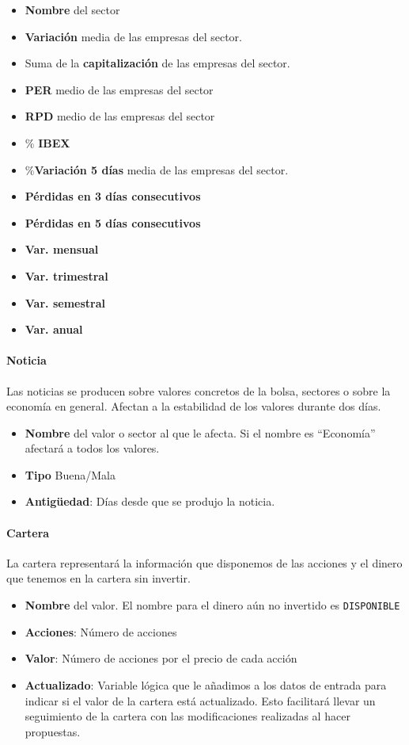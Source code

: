 \documentclass[11pt,leqno]{article}
\theoremstyle{definition_wo_parentheses}
\theoremstyle{plain}
\theoremstyle{remark}
\begin{document}
	\begin{itemize}
		\item \textbf{Nombre} del sector
		\item \textbf{Variación} media de las empresas del sector.
		\item Suma de la \textbf{capitalización} de las empresas del sector.
		\item \textbf{PER} medio de las empresas del sector
		\item \textbf{RPD} medio de las empresas del sector
		\item $\mathbf{\%}$ \textbf{IBEX}
		\item $\mathbf{\%}$\textbf{Variación 5 días} media de las empresas del sector.
		\item \textbf{Pérdidas en 3 días consecutivos}
		\item \textbf{Pérdidas en 5 días consecutivos}
		\item \textbf{Var. mensual}
		\item \textbf{Var. trimestral}
		\item \textbf{Var. semestral}
		\item \textbf{Var. anual}
	\end{itemize}
	
\paragraph{Noticia} Las noticias se producen sobre valores concretos de la bolsa, sectores o sobre la economía en general. Afectan a la estabilidad de los valores durante dos días.

	\begin{itemize}
		\item \textbf{Nombre} del valor o sector al que le afecta. Si el nombre es ``Economía'' afectará a todos los valores.
		\item \textbf{Tipo} Buena/Mala
		\item \textbf{Antigüedad}: Días desde que se produjo la noticia.
	\end{itemize}

\paragraph{Cartera} La cartera representará la información que disponemos de las acciones y el dinero que tenemos en la cartera sin invertir. 

	\begin{itemize}
		\item \textbf{Nombre} del valor. El nombre para el dinero aún no invertido es \texttt{DISPONIBLE}
		\item \textbf{Acciones}: Número de acciones
		\item \textbf{Valor}: Número de acciones por el precio de cada acción
		\item \textbf{Actualizado}: Variable lógica que le añadimos a los datos de entrada para indicar si el valor de la cartera está actualizado. Esto facilitará llevar un seguimiento de la cartera con las modificaciones realizadas al hacer propuestas.
	\end{itemize}
\end{document}
